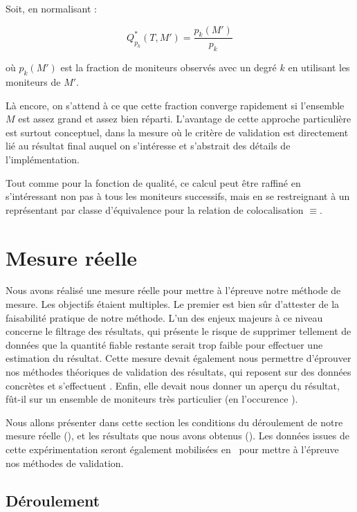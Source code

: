 Soit, en normalisant :

$$Q^*_{p_k}(T, M') = \frac{p_k(M')}{p_k}$$

où $p_k(M')$ est la fraction de moniteurs observés avec un degré $k$ en
utilisant les moniteurs de $M'$.

Là encore, on s'attend à ce que cette fraction converge rapidement si l'ensemble
$M$ est assez grand et assez bien réparti. L'avantage de cette approche
particulière est surtout conceptuel, dans la mesure où le critère de validation
est directement lié au résultat final auquel on s'intéresse et s'abstrait des
détails de l'implémentation.

Tout comme pour la fonction de qualité, ce calcul peut être raffiné en
s'intéressant non pas à tous les moniteurs successifs, mais en se restreignant à
un représentant par classe d'équivalence pour la relation de colocalisation
$\equiv$.

\section{Mesure réelle}
\label{sec:udpping-measurement}

Nous avons réalisé une mesure réelle pour mettre à l'épreuve notre méthode de
mesure. Les objectifs étaient multiples. Le premier est bien sûr d'attester de
la faisabilité pratique de notre méthode. L'un des enjeux majeurs à ce niveau
concerne le filtrage des résultats, qui présente \apriori le risque de supprimer
tellement de données que la quantité fiable restante serait trop faible pour
effectuer une estimation du résultat. Cette mesure devait également nous
permettre d'éprouver nos méthodes théoriques de validation des résultats, qui
reposent sur des données concrètes et s'effectuent \aposteriori. Enfin, elle
devait nous donner un aperçu du résultat, fût-il sur un ensemble de moniteurs
très particulier (en l'occurence \planetlab).

Nous allons présenter dans cette section les conditions du déroulement de notre
mesure réelle (), et les résultats
que nous avons obtenus (). Les
données issues de cette expérimentation seront également mobilisées
en~ pour mettre à l'épreuve nos méthodes de
validation.

\subsection{Déroulement}
\label{subsec:udpping-measurement-setup}

